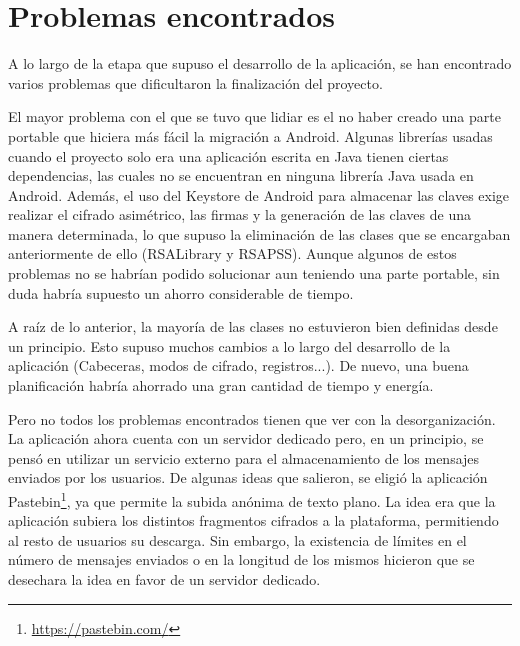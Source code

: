
\section{Problemas encontrados}

A lo largo de la etapa que supuso el desarrollo de la aplicación, se han encontrado varios problemas que dificultaron la finalización del proyecto.

El mayor problema con el que se tuvo que lidiar es el no haber creado una parte portable que hiciera más fácil la migración a Android. Algunas librerías usadas cuando el proyecto solo era una aplicación escrita en Java tienen ciertas dependencias, las cuales no se encuentran en ninguna librería Java usada en Android. Además, el uso del Keystore de Android para almacenar las claves exige realizar el cifrado asimétrico, las firmas y la generación de las claves de una manera determinada, lo que supuso la eliminación de las clases que se encargaban anteriormente de ello (RSALibrary y RSAPSS). Aunque algunos de estos problemas no se habrían podido solucionar aun teniendo una parte portable, sin duda habría supuesto un ahorro considerable de tiempo.

A raíz de lo anterior, la mayoría de las clases no estuvieron bien definidas desde un principio. Esto supuso muchos cambios a lo largo del desarrollo de la aplicación (Cabeceras, modos de cifrado, registros...). De nuevo, una buena planificación habría ahorrado una gran cantidad de tiempo y energía.

Pero no todos los problemas encontrados tienen que ver con la desorganización. La aplicación ahora cuenta con un servidor dedicado pero, en un principio, se pensó en utilizar un servicio externo para el almacenamiento de los mensajes enviados por los usuarios. De algunas ideas que salieron, se eligió la aplicación Pastebin\footnote{\url{https://pastebin.com/}}, ya que permite la subida anónima de texto plano. La idea era que la aplicación subiera los distintos fragmentos cifrados a la plataforma, permitiendo al resto de usuarios su descarga. Sin embargo, la existencia de límites en el número de mensajes enviados o en la longitud de los mismos hicieron que se desechara la idea en favor de un servidor dedicado.
